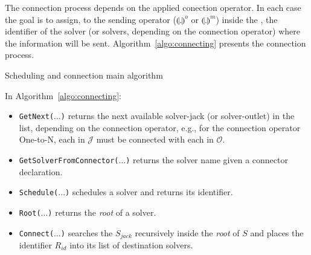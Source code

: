 The connection process depends on the applied conection operator. In each case the goal is to assign, to the sending operator ($\llparenthesis .\rrparenthesis^{o}$ or $\llparenthesis .\rrparenthesis^{m}$) inside the \as{}, the identifier of the solver (or solvers, depending on the connection operator) where the information will be sent. Algorithm~\ref{algo:connecting} presents the connection process.

\incmargin{1.4em}
\linesnumbered
\begin{algorithm}[H]
\dontprintsemicolon
\SetLine
{}

{}
\caption{Scheduling and connection main algorithm}\label{algo:connecting}
\end{algorithm}

In Algorithm~\ref{algo:connecting}:
\begin{itemize}
\item \texttt{GetNext($\dots$)} returns the next available solver-jack (or solver-outlet) in the list, depending on the connection operator, e.g., for the connection operator One-to-N, each \jack{} in $\mathcal{J}$ must be connected with each \outlet{} in $\mathcal{O}$.
\item \texttt{GetSolverFromConnector($\dots$)} returns the solver name given a connector declaration.
\item \texttt{Schedule($\dots$)} schedules a solver and returns its identifier.
\item \texttt{Root($\dots$)} returns the {\it root} \cm{} of a solver.
\item \texttt{Connect($\dots$)} %
searches the \om{} $S_{jack}$ recursively inside the {\it root} \cm{} of $S$ and places the identifier $R_{id}$ into its list of destination solvers.
\end{itemize}

